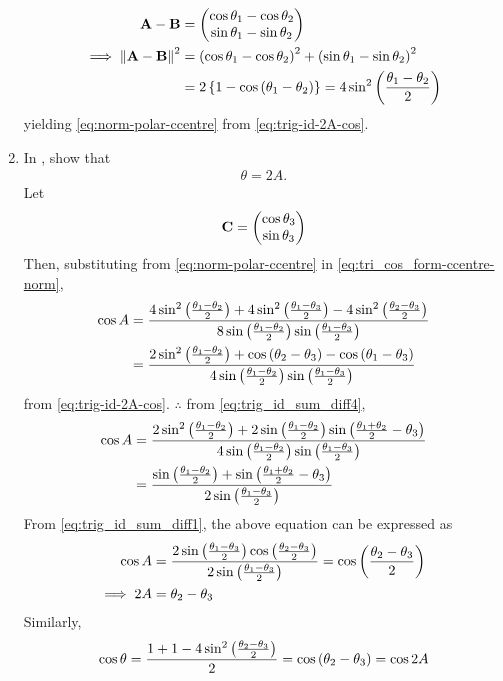 \begin{enumerate}[label=\thesection.\arabic*.,ref=\thesection.\theenumi]
\begin{align}
	  \mathbf{A}-\mathbf{B} &= 
\begin{pmatrix}\cos \theta_1-\cos \theta_2 \\ \sin \theta_1-\sin \theta_2\end{pmatrix}
\\
\implies 
	  \left\lVert\mathbf{A}-\mathbf{B}\right\rVert^2 &= 
	  \left(\cos \theta_1-\cos \theta_2\right)^2 +\left(\sin \theta_1-\sin \theta_2\right)^2
	  \\
	  &= 2\left\{1-
	  \cos \left(\theta_1-\theta_2\right)\right\} = 4 \sin^2 \left(\frac{\theta_1-\theta_2}{2}\right)
  \end{align}
  yielding 
\eqref{eq:norm-polar-ccentre} from
\eqref{eq:trig-id-2A-cos}.
  \item In 
	,
show that 
  \begin{align}
	  \theta = 2A
\label{eq:ang-subtend-ccentre}.
  \end{align}
  \solution Let 
  \begin{align}
	  \mathbf{C} = \begin{pmatrix}\cos \theta_3 \\ \sin \theta_3\end{pmatrix}
  \end{align}
  Then, 
  substituting 
  from 
\eqref{eq:norm-polar-ccentre}
in 
\eqref{eq:tri_cos_form-ccentre-norm},
  \begin{align}
	  \cos A &= \frac{4 \sin^2 \left(\frac{\theta_1-\theta_2}{2}\right) +4\sin^2 \left(\frac{\theta_1-\theta_3}{2}\right)-4 \sin^2 \left(\frac{\theta_2-\theta_3}{2}\right)}{8 \sin \left(\frac{\theta_1-\theta_2}{2}\right) \sin \left(\frac{\theta_1-\theta_3}{2}\right)}
	  \\
	   &= \frac{2 \sin^2 \left(\frac{\theta_1-\theta_2}{2}\right) +\cos \left({\theta_2-\theta_3}\right)- \cos \left({\theta_1-\theta_3}\right)}{4 \sin \left(\frac{\theta_1-\theta_2}{2}\right) \sin \left(\frac{\theta_1-\theta_3}{2}\right)}
  \end{align}
  from 
\eqref{eq:trig-id-2A-cos}. $\therefore$ from 
\eqref{eq:trig_id_sum_diff4},
  \begin{align}
	   \cos A &= \frac{2 \sin^2 \left(\frac{\theta_1-\theta_2}{2}\right) +2\sin \left(\frac{\theta_1-\theta_2}{2}\right)\sin \left(\frac{\theta_1+\theta_2}{2}-\theta_3\right)}{4 \sin \left(\frac{\theta_1-\theta_2}{2}\right) \sin \left(\frac{\theta_1-\theta_3}{2}\right)}
	  \\
	   &= \frac{ \sin \left(\frac{\theta_1-\theta_2}{2}\right) +\sin \left(\frac{\theta_1+\theta_2}{2}-\theta_3\right)}{ 2\sin\left(\frac{\theta_1-\theta_3}{2}\right)}
  \end{align}
  From 
\eqref{eq:trig_id_sum_diff1}, the above equation can be expressed as
  \begin{align}
\cos A	   &= \frac{ 2\sin \left(\frac{\theta_1-\theta_3}{2}\right) \cos\left(\frac{\theta_2-\theta_3}{2}\right)}{ 2\sin\left(\frac{\theta_1-\theta_3}{2}\right)} = \cos\left(\frac{\theta_2-\theta_3}{2}\right)
	   \\
	   \implies 2A &= \theta_2-\theta_3
  \end{align}
  Similarly, 
  \begin{align}
	  \cos \theta = \frac{1 + 1 - 4\sin^2\left(\frac{\theta_2-\theta_3}{2}\right)}{2} = \cos\left({\theta_2-\theta_3}\right)= \cos 2A
  \end{align}
\end{enumerate}
